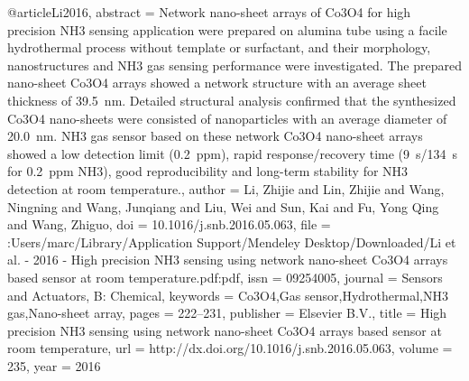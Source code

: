 @article{Li2016,
abstract = {Network nano-sheet arrays of Co3O4 for high precision NH3 sensing application were prepared on alumina tube using a facile hydrothermal process without template or surfactant, and their morphology, nanostructures and NH3 gas sensing performance were investigated. The prepared nano-sheet Co3O4 arrays showed a network structure with an average sheet thickness of 39.5 nm. Detailed structural analysis confirmed that the synthesized Co3O4 nano-sheets were consisted of nanoparticles with an average diameter of 20.0 nm. NH3 gas sensor based on these network Co3O4 nano-sheet arrays showed a low detection limit (0.2 ppm), rapid response/recovery time (9 s/134 s for 0.2 ppm NH3), good reproducibility and long-term stability for NH3 detection at room temperature.},
author = {Li, Zhijie and Lin, Zhijie and Wang, Ningning and Wang, Junqiang and Liu, Wei and Sun, Kai and Fu, Yong Qing and Wang, Zhiguo},
doi = {10.1016/j.snb.2016.05.063},
file = {:Users/marc/Library/Application Support/Mendeley Desktop/Downloaded/Li et al. - 2016 - High precision NH3 sensing using network nano-sheet Co3O4 arrays based sensor at room temperature.pdf:pdf},
issn = {09254005},
journal = {Sensors and Actuators, B: Chemical},
keywords = {Co3O4,Gas sensor,Hydrothermal,NH3 gas,Nano-sheet array},
pages = {222--231},
publisher = {Elsevier B.V.},
title = {{High precision NH3 sensing using network nano-sheet Co3O4 arrays based sensor at room temperature}},
url = {http://dx.doi.org/10.1016/j.snb.2016.05.063},
volume = {235},
year = {2016}
}
